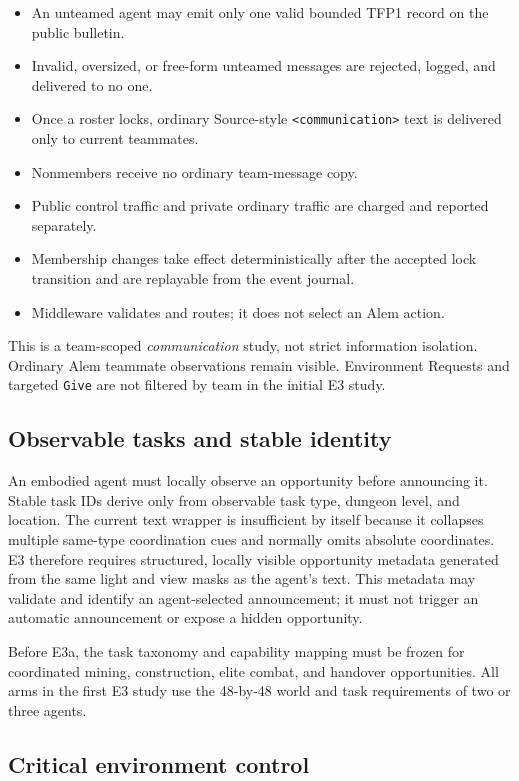 \documentclass[11pt]{article}
\newcommand{\code}[1]{\texttt{#1}}
\begin{document}
\begin{itemize}
  \item An unteamed agent may emit only one valid bounded TFP1 record on the
  public bulletin.
  \item Invalid, oversized, or free-form unteamed messages are rejected,
  logged, and delivered to no one.
  \item Once a roster locks, ordinary Source-style
  \code{<communication>} text is delivered only to current teammates.
  \item Nonmembers receive no ordinary team-message copy.
  \item Public control traffic and private ordinary traffic are charged and
  reported separately.
  \item Membership changes take effect deterministically after the accepted
  lock transition and are replayable from the event journal.
  \item Middleware validates and routes; it does not select an Alem action.
\end{itemize}

This is a team-scoped \emph{communication} study, not strict information
isolation.  Ordinary Alem teammate observations remain visible.  Environment
Requests and targeted \code{Give} are not filtered by team in the initial E3
study.

\subsection{Observable tasks and stable identity}

An embodied agent must locally observe an opportunity before announcing it.
Stable task IDs derive only from observable task type, dungeon level, and
location.  The current text wrapper is insufficient by itself because it
collapses multiple same-type coordination cues and normally omits absolute
coordinates.  E3 therefore requires structured, locally visible opportunity
metadata generated from the same light and view masks as the agent's text.
This metadata may validate and identify an agent-selected announcement; it
must not trigger an automatic announcement or expose a hidden opportunity.

Before E3a, the task taxonomy and capability mapping must be frozen for
coordinated mining, construction, elite combat, and handover opportunities.
All arms in the first E3 study use the 48-by-48 world and task requirements of
two or three agents.

\subsection{Critical environment control}
\end{document}
